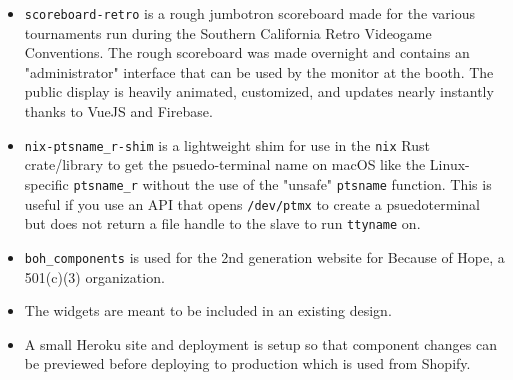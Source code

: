 \documentclass[10pt,letter,ragged2e]{altacv}
\begin{document}
\begin{paracol}{2}
\divider


\begin{itemize}
\item \texttt{scoreboard-retro} is a rough jumbotron scoreboard made for the various tournaments run during the Southern California Retro Videogame Conventions. The rough scoreboard was made overnight and contains an "administrator" interface that can be used by the monitor at the booth. The public display is heavily animated, customized, and updates nearly instantly thanks to VueJS and Firebase.
\end{itemize}

\divider


\begin{itemize}
\item \texttt{nix-ptsname\_r-shim} is a lightweight shim for use in the \texttt{nix} Rust crate/library to get the psuedo-terminal name on macOS like  the Linux-specific \texttt{ptsname\_r} without the use of the "unsafe" \texttt{ptsname} function. This is useful if you use an API that opens \texttt{/dev/ptmx} to create a psuedoterminal but does not return a file handle to the slave to run \texttt{ttyname} on.
\end{itemize}

\divider


\begin{itemize}
\item \texttt{boh\_components} is used for the 2nd generation website for Because of Hope, a 501(c)(3) organization.
\item The widgets are meant to be included in an existing design.
\item A small Heroku site and deployment is setup so that component changes can be previewed before deploying to production which is used from Shopify.
\end{itemize}




\end{paracol}
\end{document}
